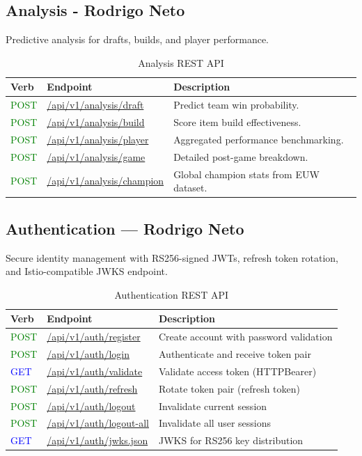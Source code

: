 \documentclass[11pt,a4paper]{article}
\newcommand{\postapi}{\textcolor{green}{POST}}
\newcommand{\getapi}{\textcolor{blue}{GET}}
\newcommand{\analysis}[1]{/api/v1/analysis#1}
\newcommand{\auth}[1]{/api/v1/auth#1}
\newcommand{\bff}[1]{\textbf{#1}}
\begin{document}
 \subsection{Analysis - Rodrigo Neto}

 Predictive analysis for drafts, builds, and player performance.

 \begin{table}[H]
 \begin{tabular}{|p{2cm}|p{5cm}|p{7cm}|}
 \hline
 \bff{Verb} & \bff{Endpoint}   & \bff{Description} \\ \hline
 \postapi & \url{\analysis/draft} & Predict team win probability. \\ \hline
 \postapi & \url{\analysis/build} & Score item build effectiveness. \\ \hline
 \postapi & \url{\analysis/player} & Aggregated performance benchmarking. \\ \hline
 \postapi & \url{\analysis/game}  & Detailed post-game breakdown. \\ \hline
 \postapi & \url{\analysis/champion} & Global champion stats from EUW dataset. \\ \hline
 \end{tabular}
 \caption{Analysis REST API}
 \label{tab:api-analysis}
 \end{table}

 
 \subsection{Authentication --- Rodrigo Neto}

 Secure identity management with RS256-signed JWTs, refresh token rotation,
 and Istio-compatible JWKS endpoint.

 \begin{table}[H]
 \centering
 \begin{tabular}{|p{2cm}|p{5cm}|p{7cm}|}
 \hline
 \bff{Verb} & \bff{Endpoint} & \bff{Description} \\
 \hline
 \postapi & \url{\auth/register} & Create account with password validation \\
 \hline
 \postapi & \url{\auth/login} & Authenticate and receive token pair \\
 \hline
 \getapi & \url{\auth/validate} & Validate access token (HTTPBearer) \\
 \hline
 \postapi & \url{\auth/refresh} & Rotate token pair (refresh token) \\
 \hline
 \postapi & \url{\auth/logout} & Invalidate current session \\
 \hline
 \postapi & \url{\auth/logout-all} & Invalidate all user sessions \\
 \hline
 \getapi & \url{\auth/jwks.json} & JWKS for RS256 key distribution \\
 \hline
 \end{tabular}
 \caption{Authentication REST API}
 \label{tab:api-auth}
 \end{table}
\end{document}
